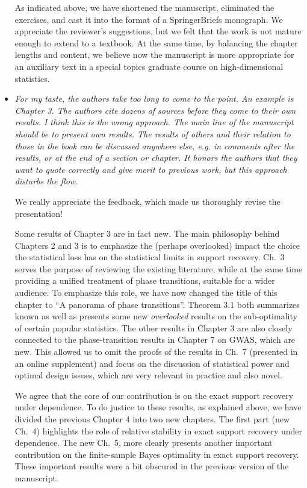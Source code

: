 \documentclass[11pt]{article}
\begin{document}
\begin{itemize}
     As indicated above, we have shortened the manuscript, eliminated the exercises, and cast it into the format of a SpringerBriefs monograph.  We 
     appreciate the reviewer's suggestions, but we felt that the work is not mature enough to extend to a textbook. At the same time, by balancing the
     chapter lengths and content, we believe now the manuscript is more appropriate for an auxiliary text in a special topics graduate course on 
     high-dimensional statistics.
     
     
     \item {\em For my taste, the authors take too long to come to the point. An example is Chapter 3. The authors cite dozens of sources before they come to their own results. I think this is the wrong approach. The main line of the manuscript should be to present own results. The results of others and their relation to those in the book can be discussed anywhere else, e.g. in comments after the results, or at the end of a section or chapter. It honors the authors that they want to quote correctly and give merit to previous work, but this approach disturbs the flow.}
     
     We really appreciate the feedback, which made us thoroughly revise the presentation!
     
     Some results of Chapter 3 are in fact new.  The main philosophy behind Chapters 2 and 3 is to emphasize the (perhaps 
     overlooked) impact the choice the statistical loss has on the statistical limits in support recovery.    Ch.\ 3 serves the purpose of reviewing 
     the existing literature, while at the same time providing a unified treatment of phase transitions, suitable for a wider audience.  To emphasize this 
     role, we have now changed the title of this chapter to ``A panorama of phase transitions''.  Theorem 3.1 both summarizes known as well as presents 
     some new {\em overlooked} results on the sub-optimality of certain popular statistics.  The other results in Chapter 3 are also closely connected to the 
    phase-transition results in Chapter 7 on GWAS, which are new.  This allowed us to omit the proofs of the results in Ch.\ 7 (presented in an online
     supplement) and focus on the discussion of statistical power and optimal design issues, which are very relevant in practice and also novel. 
     
     We agree that the core of our contribution is on the exact support recovery under dependence.  To do justice to these results, as explained above, 
     we have divided the previous Chapter 4 into two new chapters.  The first part (new Ch.\ 4) highlights the role of relative stability in exact support recovery 
     under dependence. The new Ch.\ 5, more clearly presents another important contribution on the finite-sample Bayes optimality in 
     exact support recovery.  These important results were a bit obscured in the previous version of the manuscript.  
     

\end{itemize}
\end{document}
